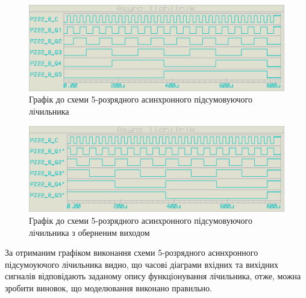 \documentclass{article}
\begin{document}
\begin{normalsize}
	\begin{figure}[H]
		\centering
		\includegraphics[scale=0.25]{g31}	
		\caption{Графік до схеми 5-розрядного асинхронного підсумовуючого лічильника}
	\end{figure}
	
	\begin{figure}[H]
		\centering
		\includegraphics[scale=0.25]{g32}	
		\caption{Графік до схеми 5-розрядного асинхронного підсумовуючого лічильника з оберненим виходом}
	\end{figure}
	
	За отриманим графіком виконання схеми 5-розрядного асинхронного підсумоуючого лічильника  видно, що часові діаграми вхідних та вихідних сигналів відповідають заданому опису функціонування лічильника, отже, можна зробити виновок, що моделювання виконано правильно.
	
	\begin{figure}[H]
		\centering
	\end{figure}


\end{normalsize}
\end{document}
